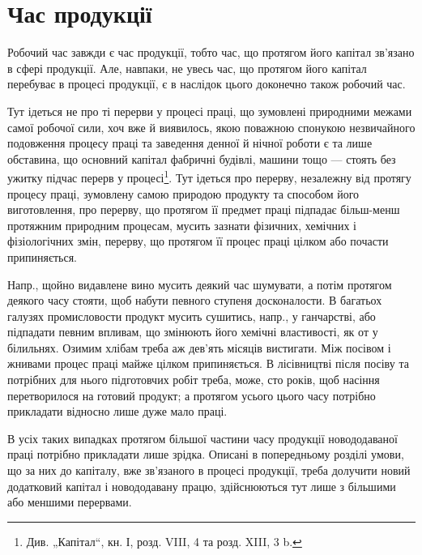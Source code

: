 
\section{Час продукції}

Робочий час завжди є час продукції, тобто час, що протягом його
капітал зв’язано в сфері продукції. Але, навпаки, не увесь час, що протягом
його капітал перебуває в процесі продукції, є в наслідок цього
доконечно також робочий час.

Тут ідеться не про ті перерви у процесі праці, що зумовлені природними
межами самої робочої сили, хоч вже й виявилось, якою поважною
спонукою незвичайного подовження процесу праці та заведення
денної й нічної роботи є та лише обставина, що основний капітал
фабричні будівлі, машини тощо — стоять без ужитку підчас перерв у процесі\footnote*{
Див. „Капітал“, кн. І, розд. VIII, 4 та розд. XIII, 3 b. 
}.
Тут ідеться про перерву, незалежну від протягу процесу праці,
зумовлену самою природою продукту та способом його виготовлення,
про перерву, що протягом її предмет праці підпадає більш-менш протяжним
природним процесам, мусить зазнати фізичних, хемічних і фізіологічних
змін, перерву, що протягом її процес праці цілком або почасти
припиняється.

Напр., щойно видавлене вино мусить деякий час шумувати, а потім
протягом деякого часу стояти, щоб набути певного ступеня досконалости.
В багатьох галузях промисловости продукт мусить сушитись, напр., у
ганчарстві, або підпадати певним впливам, що змінюють його хемічні
властивості, як от у білильнях. Озимим хлібам треба аж дев’ять місяців
вистигати. Між посівом і жнивами процес праці майже цілком припиняється.
В лісівництві після посіву та потрібних для нього підготовчих
робіт треба, може, сто років, щоб насіння перетворилося на готовий продукт;
а протягом усього цього часу потрібно прикладати відносно лише
дуже мало праці.

В усіх таких випадках протягом більшої частини часу продукції новододаваної
праці потрібно прикладати лише зрідка. Описані в попередньому
розділі умови, що за них до капіталу, вже зв’язаного в процесі
продукції, треба долучити новий додатковий капітал і новододавану працю,
здійснюються тут лише з більшими або меншими перервами.

